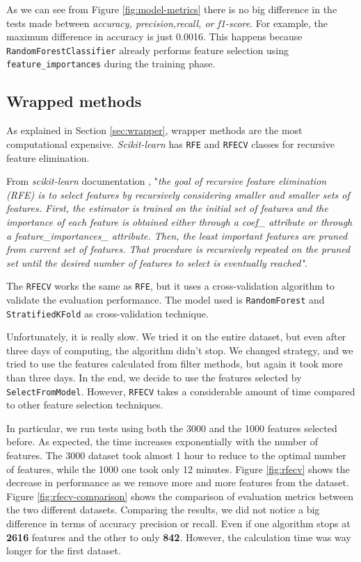 As we can see from Figure \ref{fig:model-metrics} there is no big difference in the tests made between \textit{accuracy, precision,recall, or f1-score}. For example, the maximum difference in accuracy is just 0.0016. This happens because \texttt{RandomForestClassifier} already performs feature selection using \texttt{feature\_importances} during the training phase. 

\subsection{Wrapped methods}

As explained in Section \ref{sec:wrapper}, wrapper methods are the most computational expensive. \textit{Scikit-learn} has \texttt{RFE} and \texttt{RFECV} classes for recursive feature elimination. 

From \textit{scikit-learn} documentation \cite{rfe}, "\textit{the goal of recursive feature elimination (RFE) is to select features by recursively considering smaller and smaller sets of features. First, the estimator is trained on the initial set of features and the importance of each feature is obtained either through a coef\_ attribute or through a feature\_importances\_ attribute. Then, the least important features are pruned from current set of features. That procedure is recursively repeated on the pruned set until the desired number of features to select is eventually reached"}.

The \texttt{RFECV} works the same as \texttt{RFE}, but it uses a cross-validation algorithm to validate the evaluation performance.
The model used is \texttt{RandomForest} and \texttt{StratifiedKFold} as cross-validation technique.

Unfortunately, it is really slow. We tried it on the entire dataset, but even after three days of computing, the algorithm didn't stop. We changed strategy, and we tried to use the features calculated from filter methods, but again it took more than three days. In the end, we decide to use the features selected by \texttt{SelectFromModel}. However, \texttt{RFECV} takes a considerable amount of time compared to other feature selection techniques.

In particular, we run tests using both the 3000 and the 1000 features selected before. As expected, the time increases exponentially with the number of features. The 3000 dataset took almost 1 hour to reduce to the optimal number of features, while the 1000 one took only 12 minutes.  Figure \ref{fig:rfecv} shows the decrease in performance as we remove more and more features from the dataset. Figure \ref{fig:rfecv-comparison} shows the comparison of evaluation metrics between the two different datasets.
Comparing the results, we did not notice a big difference in terms of accuracy precision or recall. Even if one algorithm stops at \textbf{2616} features and the other to only \textbf{842}. However, the calculation time was way longer for the first dataset. 

